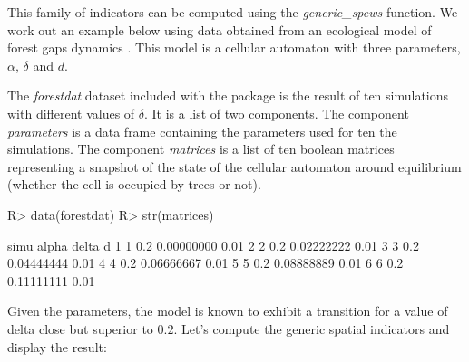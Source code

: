 \documentclass{article}
\begin{document}
This family of indicators can be computed using the \emph{generic\_spews} 
function. We work out an example below using data obtained from an ecological
model of forest gaps dynamics \citep{kubo1996}. This model is a cellular 
automaton with three parameters, $\alpha$, $\delta$ and $d$. 

The \emph{forestdat} dataset included with the package is the result of ten 
simulations with different values of $\delta$. It is a list of two components. 
The component \emph{parameters} is a data frame containing the parameters 
used for ten the simulations. The component \emph{matrices} is a list of 
ten boolean matrices representing a snapshot of the state of the cellular 
automaton around equilibrium (whether the cell is occupied by trees or not). 


\begin{Schunk}
\begin{Sinput}
R>   data(forestdat)
R>   str(matrices)
\end{Sinput}
\end{Schunk}

\begin{Schunk}
\end{Schunk}

\begin{Schunk}
\begin{Soutput}
  simu alpha      delta    d
1    1   0.2 0.00000000 0.01
2    2   0.2 0.02222222 0.01
3    3   0.2 0.04444444 0.01
4    4   0.2 0.06666667 0.01
5    5   0.2 0.08888889 0.01
6    6   0.2 0.11111111 0.01
\end{Soutput}
\end{Schunk}

Given the parameters, the model is known to exhibit a transition for a value 
of delta close but superior to $0.2$. Let's compute the generic spatial 
indicators and display the result:
  
\end{document}
